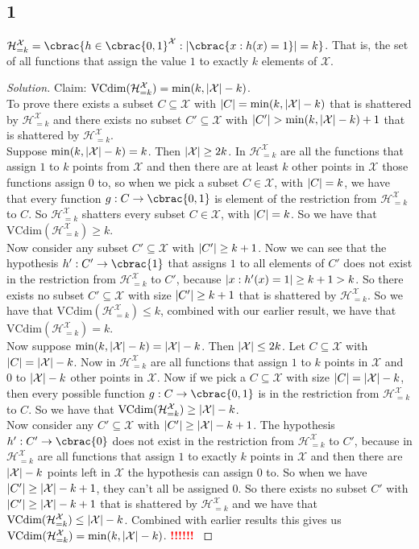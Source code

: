 \documentclass[10pt, a4paper, twoside]{amsart}
\DeclarePairedDelimiter\abs{\lvert}{\rvert}
\DeclarePairedDelimiter\cbrac\{\}
\newcommand{\cH}{\ensuremath{\mathcal{H}}}
\newcommand{\cX}{\ensuremath{\mathcal{X}}}
\newenvironment{solution}
               {\let\oldqedsymbol=\qedsymbol
                \renewcommand{\qedsymbol}{$\blacktriangleleft$}
                \begin{proof}[Solution]}
               {\end{proof}
                \renewcommand{\qedsymbol}{\oldqedsymbol}}
\newcommand{\TODO}{\textcolor{red}{\textbf{!!!!!! }}}
\begin{document}
\subsection*{1}
$\cH^{\cX}_{=k} = \cbrac{h \in \cbrac{0,1}^{\cX}: \abs{\cbrac{x: h(x) = 1}}=k}$. That is, the set of all functions that assign the value $1$ to exactly $k$ elements of $\cX$.
\begin{solution}
Claim: $\text{VCdim}(\cH^{\cX}_{=k}) = \min(k, \abs{\cX} - k)$.\\
To prove there exists a subset $C \subseteq \cX$ with  $\abs{C} = \min(k,\abs{\cX}-k)$ that is shattered by $\cH^{\cX}_{=k}$ and there exists no subset  $C' \subseteq \cX$ with $\abs{C'} > \min(k,\abs{\cX}-k)+1$ that is shattered by $\cH^{\cX}_{=k}$.\\
Suppose $\min(k,\abs{\cX}-k) = k$. Then $\abs{\cX} \geq 2k$. In $\cH^{\cX}_{=k}$ are all the functions that assign $1$ to $k$ points from $\cX$ and then there are at least $k$ other points in $\cX$ those functions assign $0$ to, so when we pick a subset $C \in \cX$, with $\abs{C} = k$, we have that every function $g: C \to \cbrac{0,1}$ is element of the restriction from $\cH^{\cX}_{=k}$ to $C$. So $\cH^{\cX}_{=k}$ shatters every subset $C \in \cX$, with $\abs{C} = k$. So we have that $\text{VCdim}(\cH^{\cX}_{=k}) \geq k$.\\
Now consider any subset $C' \subseteq \cX$ with $\abs{C'} \geq k+1$. Now we can see that the hypothesis $h':C' \to \cbrac{1}$ that assigns $1$ to all elements of $C'$ does not exist in the restriction from $\cH^{\cX}_{=k}$ to $C'$, because $\abs{x: h'(x)=1} \geq k+1>k$. So there exists no subset $C' \subseteq \cX$ with size $\abs{C'}\geq k+1$ that is shattered by $\cH^{\cX}_{=k}$. So we have that $\text{VCdim}(\cH^{\cX}_{=k}) \leq k$, combined with our earlier result, we have that $\text{VCdim}(\cH^{\cX}_{=k}) = k$.\\
Now suppose $\min(k,\abs{\cX}-k) = \abs{\cX} - k$. Then $\abs{\cX} \leq 2k$. Let $C \subseteq \cX$ with $\abs{C} = \abs{\cX}-k$. Now in $\cH^{\cX}_{=k}$ are all functions that assign $1$ to $k$ points in $\cX$ and $0$ to $\abs{\cX}-k$ other points in $\cX$. Now if we pick a $C \subseteq \cX$ with size $\abs{C} = \abs{\cX}-k $, then every possible function $g: C \to \cbrac{0,1}$ is in the restriction from $\cH^{\cX}_{=k}$ to $C$. So we have that $\text{VCdim}(\cH^{\cX}_{=k}) \geq \abs{\cX} - k$.\\
Now consider any $C' \subseteq \cX$ with $\abs{C'} \geq \abs{\cX}-k+1$. The hypothesis $h':C' \to \cbrac{0}$ does not exist in the restriction from $\cH^{\cX}_{=k}$ to $C'$, because in $\cH^{\cX}_{=k}$ are all functions that assign $1$ to exactly $k$ points in $\cX$ and then there are $\abs{\cX} - k$ points left in $\cX$ the hypothesis can assign $0$ to. So when we have $\abs{C'} \geq \abs{\cX}-k+1$, they can't all be assigned $0$. So there exists no subset $C'$ with $\abs{C'} \geq \abs{\cX}-k+1$ that is shattered by $\cH^{\cX}_{=k}$ and we have that $\text{VCdim}(\cH^{\cX}_{=k}) \leq \abs{\cX} - k$. Combined with earlier results this gives us $\text{VCdim}(\cH^{\cX}_{=k}) = \min(k, \abs{\cX} - k)$.
\TODO
\end{solution}
\end{document}

